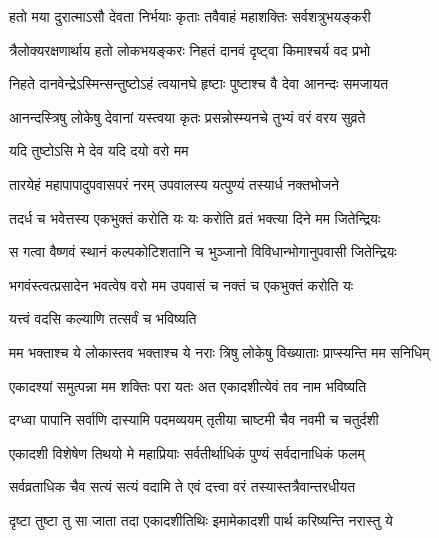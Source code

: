 \twolineshloka
{हतो मया दुरात्माऽसौ देवता निर्भयाः कृताः}
{तवैवाहं महाशक्तिः सर्वशत्रुभयङ्करी} %

\twolineshloka
{त्रैलोक्यरक्षणार्थाय हतो लोकभयङ्करः}
{निहतं दानवं दृष्ट्वा किमाश्चर्य वद प्रभो} %


\twolineshloka
{निहते दानवेन्द्रेऽस्मिन्सन्तुष्टोऽहं त्वयानघे}
{हृष्टाः पुष्टाश्च वै देवा आनन्दः समजायत} %

\twolineshloka
{आनन्दस्त्रिषु लोकेषु देवानां यस्त्वया कृतः}
{प्रसन्नोस्म्यनचे तुभ्यं वरं वरय सुव्रते} %



\onelineshloka
{यदि तुष्टोऽसि मे देव यदि दयो वरो मम} %

\twolineshloka
{तारयेहं महापापादुपवासपरं नरम्}
{उपवालस्य यत्पुण्यं तस्यार्ध नक्तभोजने} %

\twolineshloka
{तदर्ध च भवेत्तस्य एकभुक्तं करोति यः}
{यः करोति व्रतं भक्त्या दिने मम जितेन्द्रियः} %

\twolineshloka
{स गत्वा वैष्णवं स्थानं कल्पकोटिशतानि च}
{भुञ्जानो विविधान्भोगानुपवासी जितेन्द्रियः} %

\twolineshloka
{भगवंस्त्वत्प्रसादेन भवत्वेष वरो मम}
{उपवासं च नक्तं च एकभुक्तं करोति यः} %



\onelineshloka
{यत्त्वं वदसि कल्याणि तत्सर्वं च भविष्यति} %

\twolineshloka
{मम भक्ताश्च ये लोकास्तव भक्ताश्च ये नराः}
{त्रिषु लोकेषु विख्याताः प्राप्स्यन्ति मम सनिधिम्} %

\twolineshloka
{एकादश्यां समुत्पन्ना मम शक्तिः परा यतः}
{अत एकादशीत्येवं तव नाम भविष्यति} %

\twolineshloka
{दग्ध्वा पापानि सर्वाणि दास्यामि पदमव्ययम्}
{तृतीया चाष्टमी चैव नवमी च चतुर्दशी} %

\twolineshloka
{एकादशी विशेषेण तिथयो मे महाप्रियाः}
{सर्वतीर्थाधिकं पुण्यं सर्वदानाधिकं फलम्} %

\twolineshloka
{सर्वव्रताधिक चैव सत्यं सत्यं वदामि ते}
{एवं दत्त्वा वरं तस्यास्तत्रैवान्तरधीयत} %

\twolineshloka
{दृष्टा तुष्टा तु सा जाता तदा एकादशीतिथिः}
{इमामेकादशी पार्थ करिष्यन्ति नरास्तु ये} %

